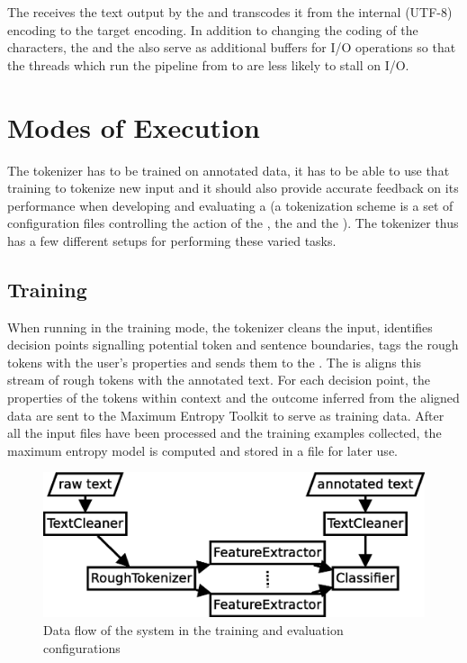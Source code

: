 The  receives the text output by the  and
transcodes it from the internal (UTF-8) encoding to the target encoding. In
addition to changing the coding of the characters, the  and the
 also serve as additional buffers for I/O operations so that
the threads which run the pipeline from  to
 are less likely to stall on I/O.


\section{Modes of Execution}
\label{sec:impl-modes}

The tokenizer has to be trained on annotated data, it has to be able to use
that training to tokenize new input and it should also provide accurate
feedback on its performance when developing and evaluating a
 (a tokenization scheme is a set of configuration
files controlling the action of the , the
 and the ). The tokenizer thus has a
few different setups for performing these varied tasks.

\subsection{Training}
\label{ssec:impl-modes-train}

When running in the training mode, the tokenizer cleans the input, identifies
decision points signalling potential token and sentence boundaries, tags the
rough tokens with the user's properties and sends them to the
. The  is aligns this stream of rough
tokens with the annotated text. For each decision point, the properties of the
tokens within context and the outcome inferred from the aligned data are sent
to the Maximum Entropy Toolkit to serve as training data. After all the input
files have been processed and the training examples collected, the maximum
entropy model is computed and stored in a file for later use.

\begin{figure}
  \includegraphics[width=\textwidth]{img/train-parts.eps}
  \caption{Data flow of the system in the training and evaluation
           configurations}
  \label{fig:train-parts}
\end{figure}

